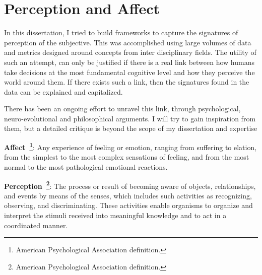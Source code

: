 \section{Perception and Affect}
In this dissertation, I tried to build frameworks to capture the signatures of perception of the subjective. This was accomplished using large volumes of data and metrics designed around concepts from inter disciplinary fields. The utility of such an attempt, can only be justified if there is a real link between how humans take decisions at the most fundamental cognitive level and how they perceive the world around them. If there exists such a link, then the signatures found in the data can be explained and capitalized. 

There has been an ongoing effort to unravel this link, through psychological, neuro-evolutional and philosophical arguments. I will try to gain inspiration from them, but a detailed critique is beyond the scope of my dissertation and expertise\\
\begin{definition}
    \textbf{Affect~\footnote{American Psychological Association definition.}}: Any experience of feeling or emotion, ranging from suffering to elation, from the simplest to the most complex sensations of feeling, and from the most normal to the most pathological emotional reactions.\\
\end{definition}


\begin{definition}
    \textbf{Perception~\footnote{American Psychological Association definition.}}: The process or result of becoming aware of objects, relationships, and events by means of the senses, which includes such activities as recognizing, observing, and discriminating. These activities enable organisms to organize and interpret the stimuli received into meaningful knowledge and to act in a coordinated manner.
\end{definition}


